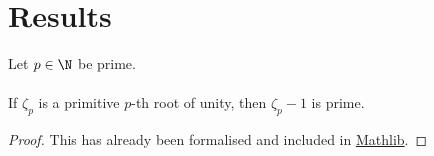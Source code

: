 \begin{definition}[Ring]
    \label{def:ring}
\end{definition}

\begin{definition}[Field]
    \label{def:field}
\end{definition}
\begin{definition}
    \label{def:number_field}
\end{definition}

\begin{definition}
    \label{def:fundamental_system}
\end{definition}

\begin{definition}[Unit]
    \label{def:primitive_element}
\end{definition}
\begin{definition}
    \label{def:primitive_root_of_unity}
\end{definition}

\begin{definition}
    \label{def:cyclotomic_polynomial}
\end{definition}
\begin{definition}
    \label{def:cyclotomic_extension_field}
\end{definition}
\begin{definition}
    \label{def:cyclotomic_extension_field}
\end{definition}



\section{Results}

\begin{theorem}
    \label{thm:zeta_sub_one_prime1}
    \leanok
    Let $p \in \N$ be prime. \\\\
    If $\zeta_p$ is a primitive $p$-th root of unity, then $\zeta_p - 1$ is prime.
\end{theorem}
\begin{proof}
    \leanok
    This has already been formalised and included in \href{https://pitmonticone.github.io/FLT3/docs/FLT3/Mathlib/NumberTheory/Cyclotomic/Rat.html#IsPrimitiveRoot.zeta_sub_one_prime'}{Mathlib}.
\end{proof}

